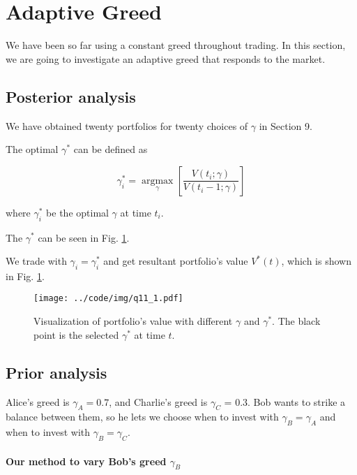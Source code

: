 \documentclass[runningheads]{llncs}
\begin{document}
\section{Adaptive Greed}\label{sec:11}

We have been so far using a constant greed throughout trading. In this section, we are going to investigate an adaptive greed that responds to the market.

\subsection{Posterior analysis}
We have obtained twenty portfolios for twenty choices of $\gamma$ in Section 9.

The optimal $\gamma^*$ can be defined as

\begin{equation}
\gamma_i^*=\underset{\gamma}{\operatorname{argmax}}\left[\frac{V\left(t_i ; \gamma\right)}{V\left(t_i-1 ; \gamma\right)}\right] 
\end{equation}

where $\gamma_i^*$ be the optimal $\gamma$ at time $t_i$.

The $\gamma^*$ can be seen in Fig. \ref{fig:q11-1}.

We trade with $\gamma_i=\gamma_i^*$ and get resultant portfolio's value $V^*(t)$, which is shown in Fig. \ref{fig:q11-1}.


\begin{figure}[!htbp]
    \begin{center}
        \texttt{[image: ../code/img/q11\_1.pdf]}
    \end{center}
    \caption{Visualization of portfolio's value with different $\gamma$ and $\gamma^*$. The black point is the selected $\gamma^*$ at time $t$.}
    \label{fig:q11-1}
\end{figure}

\subsection{Prior analysis}

Alice's greed is $\gamma_A = 0.7$, and Charlie's greed is $\gamma_C$ = 0.3. 
Bob wants to strike a balance between them, so he lets we choose when to invest with $\gamma_B = \gamma_A$ and 
when to invest with $\gamma_B = \gamma_C$. 
\paragraph{Our method to vary Bob's greed $\gamma_B$}
\end{document}
